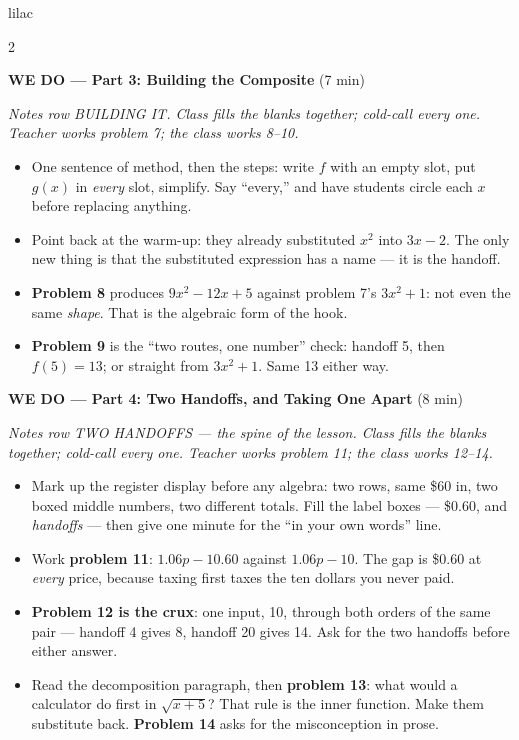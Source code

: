 \documentclass[10pt]{article}
\begin{document}
\begin{skillbox}{lilac}
\begin{multicols}{2}
\columnbreak

\textbf{WE DO --- Part 3: Building the Composite} (7 min)

\textit{Notes row BUILDING IT. Class fills the blanks together; cold-call every
one. Teacher works problem 7; the class works 8--10.}
\begin{itemize}
  \item One sentence of method, then the steps: write $f$ with an empty slot, put
        $g(x)$ in \emph{every} slot, simplify. Say ``every,'' and have students
        circle each $x$ before replacing anything.
  \item Point back at the warm-up: they already substituted $x^2$ into
        $3x - 2$. The only new thing is that the substituted expression has a
        name --- it is the handoff.
  \item \textbf{Problem 8} produces $9x^2 - 12x + 5$ against problem 7's
        $3x^2 + 1$: not even the same \emph{shape}. That is the algebraic form of
        the hook.
  \item \textbf{Problem 9} is the ``two routes, one number'' check: handoff 5,
        then $f(5) = 13$; or straight from $3x^2+1$. Same 13 either way.
\end{itemize}

\textbf{WE DO --- Part 4: Two Handoffs, and Taking One Apart} (8 min)

\textit{Notes row TWO HANDOFFS --- the spine of the lesson. Class fills the
blanks together; cold-call every one. Teacher works problem 11; the class works
12--14.}
\begin{itemize}
  \item Mark up the register display before any algebra: two rows, same \$60 in,
        two boxed middle numbers, two different totals. Fill the label boxes ---
        \$0.60, and \textit{handoffs} --- then give one minute for the ``in your
        own words'' line.
  \item Work \textbf{problem 11}: $1.06p - 10.60$ against $1.06p - 10$. The gap
        is \$0.60 at \emph{every} price, because taxing first taxes the ten
        dollars you never paid.
  \item \textbf{Problem 12 is the crux}: one input, 10, through both orders of
        the same pair --- handoff 4 gives 8, handoff 20 gives 14. Ask for the two
        handoffs before either answer.
  \item Read the decomposition paragraph, then \textbf{problem 13}: what would a
        calculator do first in $\sqrt{x+5}$? That rule is the inner function.
        Make them substitute back. \textbf{Problem 14} asks for the
        misconception in prose.
\end{itemize}


\end{multicols}
\end{skillbox}
\end{document}
